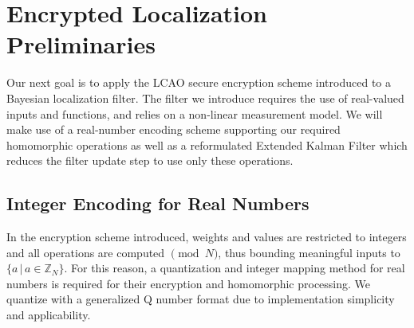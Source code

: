\documentclass[10pt,letterpaper,oneside,twocolumn,journal]{IEEEtran}
\theoremstyle{definition}
\theoremstyle{definition}
\theoremstyle{remark}
\begin{document}
% 
%                                                                                                     
%                                                                                                     
%                                                                                                     
% 

\section{Encrypted Localization Preliminaries} \label{sec:loc_prelim}
Our next goal is to apply the LCAO secure encryption scheme introduced to a Bayesian localization filter. The filter we introduce requires the use of real-valued inputs and functions, and relies on a non-linear measurement model. We will make use of a real-number encoding scheme supporting our required homomorphic operations as well as a reformulated Extended Kalman Filter which reduces the filter update step to use only these operations.

% 
% 

\subsection{Integer Encoding for Real Numbers} \label{subsec:encoding}
In the encryption scheme introduced, weights and values are restricted to integers and all operations are computed $\pmod{N}$, thus bounding meaningful inputs to $\{a \,|\, a \in \mathbb{Z}_N\}$. For this reason, a quantization and integer mapping method for real numbers is required for their encryption and homomorphic processing. We quantize with a generalized Q number format \cite{oberstarFixedPointRepresentationFractional2007} due to implementation simplicity and applicability.
\end{document}
